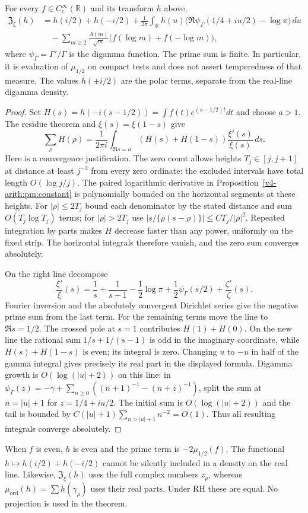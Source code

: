 \begin{theorem}
\label{v4-arith:pm:weil}
For every $f\in C_c^\infty(\mathbb R)$ and its transform $h$ above,
\begin{align*}
 \mathfrak Z_\xi(h)
 &=h(i/2)+h(-i/2)
   +\frac1{2\pi}\int_{\mathbb R}
       h(u)\bigl(\Re\psi_\Gamma(1/4+iu/2)-\log\pi\bigr)\,du\\
 &\quad-\sum_{m\geq2}\frac{\Lambda(m)}{\sqrt m}
                  \bigl(f(\log m)+f(-\log m)\bigr),
\end{align*}
where $\psi_\Gamma=\Gamma'/\Gamma$ is the digamma function.
The prime sum is finite. In particular, it is evaluation of
$\mu_{1/2}$ on compact tests and does not assert temperedness of
that measure. The values $h(\pm i/2)$ are the polar terms, separate
from the real-line digamma density.
\end{theorem}
\begin{proof}
Set $H(s)=h(-i(s-1/2))=\int f(t)e^{(s-1/2)t}dt$ and choose $a>1$.
The residue theorem and $\xi(s)=\xi(1-s)$ give
\[
 \sum_\rho H(\rho)
 =\frac1{2\pi i}\int_{\Re s=a}
             (H(s)+H(1-s))\frac{\xi'(s)}{\xi(s)}\,ds.
\]
Here is a convergence justification. The zero count allows heights
$T_j\in[j,j+1]$ at distance at least $j^{-2}$ from every zero
ordinate: the excluded intervals have total length $O(\log j/j)$.
The paired logarithmic derivative in
Proposition~\ref{v4-arith:pm:constant} is polynomially bounded on
the horizontal segments at these heights. For $|\rho|\leq2T_j$
bound each denominator by the stated distance and sum
$O(T_j\log T_j)$ terms; for $|\rho|>2T_j$ use
$|s/\{\rho(s-\rho)\}|\leq C T_j/|\rho|^2$.
Repeated integration by parts makes $H$ decrease faster than any
power, uniformly on the fixed strip. The horizontal integrals
therefore vanish, and the zero sum converges absolutely.

On the right line decompose
\[
 \frac{\xi'}\xi(s)
 =\frac1s+\frac1{s-1}-\frac12\log\pi
       +\frac12\psi_\Gamma(s/2)+\frac{\zeta'}\zeta(s).
\]
Fourier inversion and the absolutely convergent Dirichlet series
give the negative prime sum from the last term. For the remaining
terms move the line to $\Re s=1/2$. The crossed pole at $s=1$
contributes $H(1)+H(0)$. On the new line the rational sum
$1/s+1/(s-1)$ is odd in the imaginary coordinate, while
$H(s)+H(1-s)$ is even; its integral is zero. Changing $u$ to $-u$
in half of the gamma integral gives precisely its real part in the
displayed formula. Digamma growth is $O(\log(|u|+2))$ on this
line: in
$\psi_\Gamma(z)=-\gamma+\sum_{n\geq0}((n+1)^{-1}-(n+z)^{-1})$,
split the sum at $n=|u|+1$ for $z=1/4+iu/2$. The initial sum
is $O(\log(|u|+2))$ and the tail is bounded by
$C(|u|+1)\sum_{n>|u|+1}n^{-2}=O(1)$.
Thus all resulting integrals converge absolutely.
\end{proof}

When $f$ is even, $h$ is even and the prime term is
$-2\mu_{1/2}(f)$. The functional
$h\mapsto h(i/2)+h(-i/2)$ cannot be silently included in a density
on the real line. Likewise, $\mathfrak Z_\xi(h)$ uses the full
complex numbers $z_\rho$, whereas
$\mu_{\mathrm{ord}}(h)=\sum h(\gamma_\rho)$ uses their real parts.
Under RH these are equal. No projection is used in the theorem.

